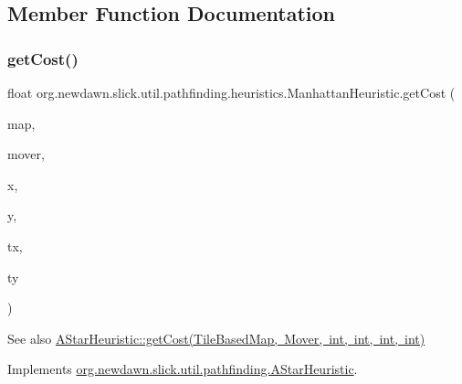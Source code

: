 \subsection{Member Function Documentation}
\mbox{\label{classorg_1_1newdawn_1_1slick_1_1util_1_1pathfinding_1_1heuristics_1_1_manhattan_heuristic_a9ff77608b7c1a2b33cce627c5495b39e}} 
\subsubsection{\texorpdfstring{get\+Cost()}{getCost()}}
{\footnotesize\ttfamily float org.\+newdawn.\+slick.\+util.\+pathfinding.\+heuristics.\+Manhattan\+Heuristic.\+get\+Cost (\begin{DoxyParamCaption}\item[{\mbox{\hyperlink{interfaceorg_1_1newdawn_1_1slick_1_1util_1_1pathfinding_1_1_tile_based_map}{Tile\+Based\+Map}}}]{map,  }\item[{\mbox{\hyperlink{interfaceorg_1_1newdawn_1_1slick_1_1util_1_1pathfinding_1_1_mover}{Mover}}}]{mover,  }\item[{int}]{x,  }\item[{int}]{y,  }\item[{int}]{tx,  }\item[{int}]{ty }\end{DoxyParamCaption})\hspace{0.3cm}{\ttfamily [inline]}}

\begin{DoxySeeAlso}{See also}
\mbox{\hyperlink{interfaceorg_1_1newdawn_1_1slick_1_1util_1_1pathfinding_1_1_a_star_heuristic_a6655bf4053ece54e62beec26876ad285}{A\+Star\+Heuristic\+::get\+Cost(\+Tile\+Based\+Map, Mover, int, int, int, int)}} 
\end{DoxySeeAlso}


Implements \mbox{\hyperlink{interfaceorg_1_1newdawn_1_1slick_1_1util_1_1pathfinding_1_1_a_star_heuristic_a6655bf4053ece54e62beec26876ad285}{org.\+newdawn.\+slick.\+util.\+pathfinding.\+A\+Star\+Heuristic}}.


